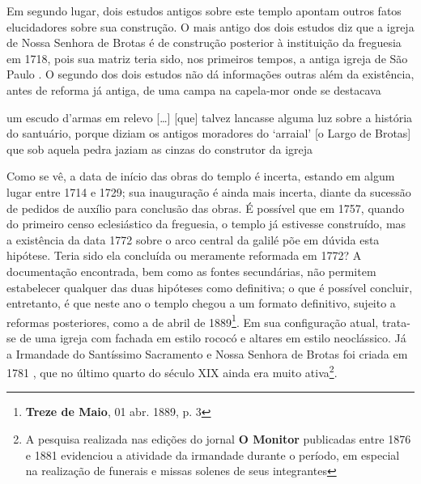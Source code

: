Em segundo lugar, dois estudos antigos sobre este templo \cite{campos_brotas_1942,texbar_capellas_1930} apontam outros fatos elucidadores sobre sua construção. O mais antigo dos dois estudos diz que a igreja de Nossa Senhora de Brotas é de construção posterior à instituição da freguesia em 1718, pois sua matriz teria sido, nos primeiros tempos, a antiga igreja de São Paulo \cite[p.~344]{texbar_capellas_1930}. O segundo dos dois estudos não dá informações outras além da existência, antes de reforma já antiga, de uma campa na capela-mor onde se destacava 

\begin{citacao}
um escudo d'armas em relevo [\dots] [que] talvez lancasse alguma luz sobre a história do santuário, porque diziam os antigos moradores do `arraial' [o Largo de Brotas] que sob aquela pedra jaziam as cinzas do construtor da igreja \cite[p.~88]{campos_brotas_1942}
\end{citacao}

Como se vê, a data de início das obras do templo é incerta, estando em algum lugar entre 1714 e 1729; sua inauguração é ainda mais incerta, diante da sucessão de pedidos de auxílio para conclusão das obras. É possível que em 1757, quando do primeiro censo eclesiástico da freguesia, o templo já estivesse construído, mas a existência da data 1772 sobre o arco central da galilé põe em dúvida esta hipótese. Teria sido ela concluída ou meramente reformada em 1772? A documentação encontrada, bem como as fontes secundárias, não permitem estabelecer qualquer das duas hipóteses como definitiva; o que é possível concluir, entretanto, é que neste ano o templo chegou a um formato definitivo, sujeito a reformas posteriores, como a de abril de 1889\footnote{\textbf{Treze de Maio}, 01 abr. 1889, p. 3}. Em sua configuração atual, trata-se de uma igreja com fachada em estilo rococó e altares em estilo neoclássico. Já a Irmandade do Santíssimo Sacramento e Nossa Senhora de Brotas foi criada em 1781 \cite[p.~172]{VASCONCELOS2002}, que no último quarto do século XIX ainda era muito ativa\footnote{A pesquisa realizada nas edições do jornal \textbf{O Monitor} publicadas entre 1876 e 1881 evidenciou a atividade da irmandade durante o período, em especial na realização de funerais e missas solenes de seus integrantes}.


